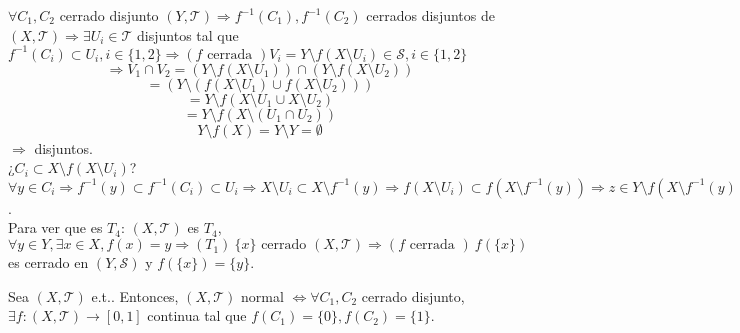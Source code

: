 \begin{dem}
$\forall C_{1}, C_{2}$ cerrado disjunto $( Y, \mathcal{T} ) \Rightarrow f^{-1}(C_{1}), f^{-1}(C_{2})$ cerrados disjuntos de $( X, \mathcal{T} ) \Rightarrow \exists U_{i} \in \mathcal{T}$ disjuntos tal que $f^{-1}(C_{i}) \subset U_{i}, i \in \{ 1, 2 \} \Rightarrow (f \text{ cerrada }) V_{i} = Y \setminus f(X \setminus U_{i}) \in \mathcal{S}, i \in \{ 1, 2 \} $ 
\[
  \Rightarrow V_{1} \cap V_{2} = ( Y \setminus f(X \setminus U_{1}) ) \cap ( Y \setminus f(X \setminus U_{2})) 
\]
\[
  = (Y \setminus (f(X \setminus U_{1}) \cup f(X \setminus U_{2})) )
\]
\[ 
  = Y \setminus f(X \setminus U_{1} \cup X \setminus U_{2}) 
\] 
\[ 
  = Y \setminus f(X \setminus (U_{1} \cap U_{2}))
\] 
\[ 
  Y \setminus f(X) = Y \setminus Y = \emptyset 
\] 
$\Rightarrow$ disjuntos. \\

¿$C_{i} \subset X \setminus f(X \setminus U_{i})$? $ \forall y \in C_{i} \Rightarrow f^{-1}(y) \subset f^{-1}(C_{i}) \subset U_{i} \Rightarrow X \setminus U_{i} \subset X \setminus f^{-1}(y) \Rightarrow f(X \setminus U_{i} ) \subset f(X \setminus f^{-1}(y)) \Rightarrow z \in Y \setminus f(X \setminus f^{-1}(y)) \subset Y \setminus f(X \setminus U_{i}) = V_{i} \Rightarrow z \not \in f(X \setminus f^{-1}(y)) \Rightarrow z = f(x') : x' \in X \setminus f^{-1}(y) \Rightarrow x' \in f^{-1}(y) \Rightarrow f(x') = y \Rightarrow z = y \Rightarrow \forall y \in C_{i}, y \in V_{i}$. \\

Para ver que es $T_{4}$:  $( X, \mathcal{T} )$ es $T_{4}$, $\forall y \in Y, \exists x \in X, f(x) = y \Rightarrow (T_{1}) \ \{ x \} \text{ cerrado } ( X, \mathcal{T} ) \Rightarrow (f \text{ cerrada }) \ f(\{ x \})$ es cerrado en $( Y, \mathcal{S} )$ y $ f(\{ x \}) = \{  y \}$.
%
\end{dem}

\begin{lem}[Urysohn]
  Sea $( X, \mathcal{T} )$ e.t.. Entonces, $( X, \mathcal{T} )$ normal $\Leftrightarrow \forall C_{1}, C_{2}$ cerrado disjunto, $\exists f: ( X, \mathcal{T} ) \to [0, 1]$ continua tal que $f(C_{1}) = \{  0 \}, f(C_{2}) = \{ 1 \}$.
\end{lem}

